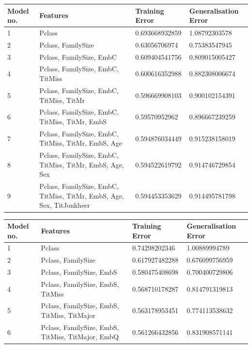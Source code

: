 \documentclass[a4paper]{scrartcl}
\begin{document}
\begin{center}
\begin{tabular}{| p{2cm} | p{6cm} | l | l |}
\hline
\textbf{Model no.} & \textbf{Features} & \textbf{Training Error} &\textbf{Generalisation Error} \\ \hline
1 & Pclass & 0.693668932859 & 1.08792303578 \\ \hline
2 & Pclass, FamilySize & 0.63056706974 & 0.75383547945 \\ \hline
3 & Pclass, FamilySize, EmbC & 0.609404541756 & 0.809015005427 \\ \hline
4 & Pclass, FamilySize, EmbC, TitMiss & 0.600616352988 & 0.882308006674 \\ \hline
5 & Pclass, FamilySize, EmbC, TitMiss, TitMr & 0.596669908103 & 0.900102154391 \\ \hline
6 & Pclass, FamilySize, EmbC, TitMiss, TitMr, EmbS & 0.59570952962 & 0.896667239259 \\ \hline
7 & Pclass, FamilySize, EmbC, TitMiss, TitMr, EmbS, Age & 0.594876034449 & 0.915238158019 \\ \hline
8 & Pclass, FamilySize, EmbC, TitMiss, TitMr, EmbS, Age, Sex & 0.594522619792 & 0.914746729854 \\ \hline
9 & Pclass, FamilySize, EmbC, TitMiss, TitMr, EmbS, Age, Sex, TitJonkheer & 0.594453353629 & 0.914495781798 \\ \hline

\end{tabular}
\end{center}

\begin{tabular}{| p{2cm} | p{6cm} | l | l |}
\hline
\textbf{Model no.} & \textbf{Features} & \textbf{Training Error} &\textbf{Generalisation Error} \\ \hline
1 & Pclass & 0.74298202346 & 1.00889994789 \\ \hline
2 & Pclass, FamilySize & 0.617927482288 & 0.676099756959 \\ \hline
3 & Pclass, FamilySize, EmbS & 0.580475408698 & 0.700400729806 \\ \hline
4 & Pclass, FamilySize, EmbS, TitMiss & 0.568710178287 & 0.814791319813 \\ \hline
5 & Pclass, FamilySize, EmbS, TitMiss, TitMajor & 0.563178953451 & 0.774113538632 \\ \hline
6 & Pclass, FamilySize, EmbS, TitMiss, TitMajor, EmbQ & 0.561266432856 & 0.831908571141 \\ \hline
\end{tabular}
\end{document}
